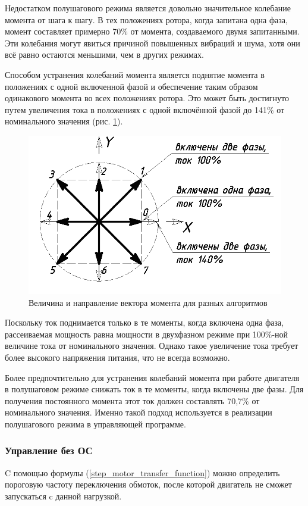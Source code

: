 Недостатком полушагового режима является довольно значительное колебание момента от
шага к шагу. В тех положениях ротора, когда запитана одна фаза, момент составляет
примерно 70\% от момента, создаваемого двумя запитанными. Эти колебания могут
явиться причиной повышенных вибраций и шума, хотя они всё равно остаются меньшими,
чем в других режимах.

Способом устранения колебаний момента является поднятие момента в
положениях с одной включенной фазой и обеспечение таким образом одинакового момента
во всех положениях ротора. Это может быть достигнуто путем увеличения тока в
положениях с одной включённой фазой до 141\% от номинального значения
(рис. \ref{pic_torque_diagram}).

\begin{figure}
    \centering
    \includegraphics[width=0.6\linewidth, keepaspectratio]
                    {./src/pictures/control_algo/torque_diag}
    \caption{Величина и направление вектора момента для разных алгоритмов}
    \label{pic_torque_diagram}
\end{figure}

Поскольку ток поднимается только в те моменты, когда включена одна фаза, рассеиваемая
мощность равна мощности в двухфазном режиме при 100\%-ной величине тока от
номинального значения. Однако такое увеличение тока требует более высокого
напряжения питания, что не всегда возможно.

Более предпочтительно для устранения колебаний момента при работе двигателя в
полушаговом режиме снижать ток в те моменты, когда включены две фазы. Для
получения постоянного момента этот ток должен составлять 70,7\% от номинального
значения. Именно такой подход используется в реализации полушагового режима
в управляющей программе.


\newpage
\subsubsection{Управление без ОС}
C помощью формулы (\ref{step_motor_transfer_function}) можно определить пороговую
частоту переключения обмоток, после которой двигатель не сможет запускаться c
данной нагрузкой.

